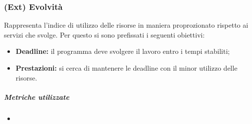 \subsubsection{(Ext) Evolvità}
Rappresenta l'indice di utilizzo delle risorse in maniera proprozionato rispetto ai servizi che svolge. Per questo si sono prefissati i seguenti obiettivi:
\begin{itemize}
	\item{\textbf{Deadline:}  il programma deve svolgere il lavoro entro i tempi stabiliti;}
	\item{\textbf{Prestazioni:} si cerca di mantenere le deadline con il minor utilizzo delle risorse.}
\end{itemize}
\vspace{0.8cm}
\subparagraph{Metriche utilizzate}
\begin{itemize}
	\item 
\end{itemize}
\begin{table}[!htpb]
\end{table}